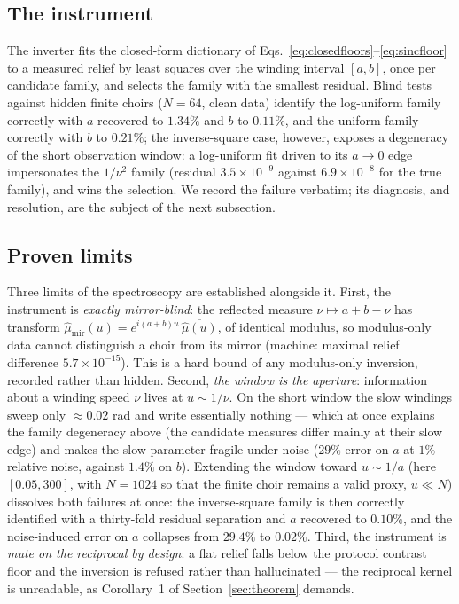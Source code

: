 \documentclass[11pt,a4paper]{article}
\begin{document}
\subsection{The instrument}
\label{sec:instrument}

The inverter fits the closed-form dictionary of
Eqs.~\eqref{eq:closedfloors}--\eqref{eq:sincfloor} to a measured relief
by least squares over the winding interval $[a, b]$, once per candidate
family, and selects the family with the smallest residual. Blind tests
against hidden finite choirs ($N = 64$, clean data) identify the
log-uniform family correctly with $a$ recovered to $1.34\%$ and $b$ to
$0.11\%$, and the uniform family correctly with $b$ to $0.21\%$; the
inverse-square case, however, exposes a degeneracy of the short
observation window: a log-uniform fit driven to its $a \to 0$ edge
impersonates the $1/\nu^2$ family (residual $3.5\times10^{-9}$ against
$6.9\times10^{-8}$ for the true family), and wins the selection. We
record the failure verbatim; its diagnosis, and resolution, are the
subject of the next subsection.

\subsection{Proven limits}
\label{sec:limits}

Three limits of the spectroscopy are established alongside it. First,
the instrument is \emph{exactly mirror-blind}: the reflected measure
$\nu \mapsto a + b - \nu$ has transform
$\hat{\mu}_{\mathrm{mir}}(u) = e^{i(a+b)u}\,\overline{\hat{\mu}(u)}$,
of identical modulus, so modulus-only data cannot distinguish a choir
from its mirror (machine: maximal relief difference $5.7\times10^{-15}$).
This is a hard bound of any modulus-only inversion, recorded rather than
hidden. Second, \emph{the window is the aperture}: information about a
winding speed $\nu$ lives at $u \sim 1/\nu$. On the short window the
slow windings sweep only $\approx 0.02$ rad and write essentially
nothing --- which at once explains the family degeneracy above (the
candidate measures differ mainly at their slow edge) and makes the slow
parameter fragile under noise ($29\%$ error on $a$ at $1\%$ relative
noise, against $1.4\%$ on $b$). Extending the window toward
$u \sim 1/a$ (here $[0.05, 300]$, with $N = 1024$ so that the finite
choir remains a valid proxy, $u \ll N$) dissolves both failures at once:
the inverse-square family is then correctly identified with a
thirty-fold residual separation and $a$ recovered to $0.10\%$, and the
noise-induced error on $a$ collapses from $29.4\%$ to $0.02\%$. Third,
the instrument is \emph{mute on the reciprocal by design}: a flat relief
falls below the protocol contrast floor and the inversion is refused
rather than hallucinated --- the reciprocal kernel is unreadable, as
Corollary~1 of Section~\ref{sec:theorem} demands.
\end{document}
